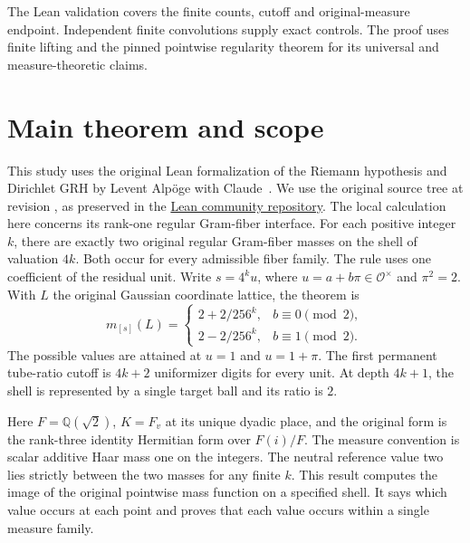 \documentclass[12pt,letterpaper]{article}
\newcommand{\code}[1]{\texttt{\detokenize{#1}}}
\begin{document}
The Lean validation covers the finite counts, cutoff and original-measure endpoint. Independent finite convolutions supply exact controls. The proof uses finite lifting and the pinned pointwise regularity theorem for its universal and measure-theoretic claims.
\clearpage
\makeatletter
\begingroup\small\setlength{\parskip}{0pt}
\renewcommand*{\l@section}[2]{\addvspace{3pt}\@dottedtocline{1}{0em}{1.9em}{#1}{#2}}
\tableofcontents\endgroup
\makeatother
\clearpage{}
\section{Main theorem and scope}
\label{sec:unit-classification}
This study uses the original Lean formalization of the Riemann hypothesis and Dirichlet GRH by Levent Alp\"oge with Claude~\cite{alpoge2026}. We use the original source tree at revision \code{40e56bab}, as preserved in the \href{https://github.com/leanprover-community/riemann-hypothesis/tree/40e56bab026552e089d7afcfeff08d2defb9c005}{Lean community repository}. The local calculation here concerns its rank-one regular Gram-fiber interface.
For each positive integer $k$, there are exactly two original regular Gram-fiber masses on the shell of valuation $4k$. Both occur for every admissible fiber family. The rule uses one coefficient of the residual unit. Write $s=4^k u$, where $u=a+b\pi\in\mathcal O^\times$ and $\pi^2=2$. With $L$ the original Gaussian coordinate lattice, the theorem is
\[
m_{[s]}(L)=
\begin{cases}
2+2/256^k,& b\equiv 0\pmod2,\\
2-2/256^k,& b\equiv 1\pmod2.
\end{cases}
\]
The possible values are attained at $u=1$ and $u=1+\pi$. The first permanent tube-ratio cutoff is $4k+2$ uniformizer digits for every unit. At depth $4k+1$, the shell is represented by a single target ball and its ratio is $2$.

Here $F=\mathbb Q(\sqrt2)$, $K=F_v$ at its unique dyadic place, and the original form is the rank-three identity Hermitian form over $F(i)/F$. The measure convention is scalar additive Haar mass one on the integers. The neutral reference value two lies strictly between the two masses for any finite $k$. This result computes the image of the original pointwise mass function on a specified shell. It says which value occurs at each point and proves that each value occurs within a single measure family.
\end{document}
